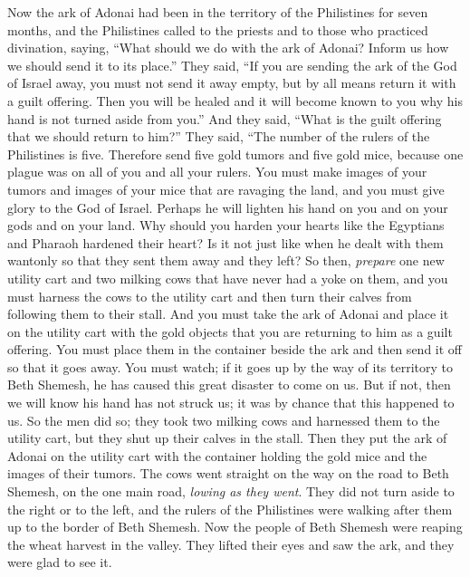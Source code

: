 \begin{biblechapter} %
 Now the ark of Adonai had been in the territory of the Philistines for seven months,
\verse and the Philistines called to the priests and to those who practiced divination, saying, “What should we do with the ark of Adonai? Inform us how we should send it to its place.”
\verse They said, “If you are sending the ark of the God of Israel away, you must not send it away empty, but by all means return it with a guilt offering. Then you will be healed and it will become known to you why his hand is not turned aside from you.”
\verse And they said, “What is the guilt offering that we should return to him?” They said, “The number of the rulers of the Philistines is five. Therefore send five gold tumors and five gold mice, because one plague was on all of you and all your rulers.
\verse You must make images of your tumors and images of your mice that are ravaging the land, and you must give glory to the God of Israel. Perhaps he will lighten his hand on you and on your gods and on your land.
\verse Why should you harden your hearts like the Egyptians and Pharaoh hardened their heart? Is it not just like when he dealt with them wantonly so that they sent them away and they left?
\verse So then, \textit{prepare} one new utility cart and two milking cows that have never had a yoke on them, and you must harness the cows to the utility cart and then turn their calves from following them to their stall.
\verse And you must take the ark of Adonai and place it on the utility cart with the gold objects that you are returning to him as a guilt offering. You must place them in the container beside the ark and then send it off so that it goes away.
\verse You must watch; if it goes up by the way of its territory to Beth Shemesh, he has caused this great disaster to come on us. But if not, then we will know his hand has not struck us; it was by chance that this happened to us.
\verse So the men did so; they took two milking cows and harnessed them to the utility cart, but they shut up their calves in the stall.
\verse Then they put the ark of Adonai on the utility cart with the container holding the gold mice and the images of their tumors.
\verse The cows went straight on the way on the road to Beth Shemesh, on the one main road, \textit{lowing as they went}. They did not turn aside to the right or to the left, and the rulers of the Philistines were walking after them up to the border of Beth Shemesh.
\verse Now the people of Beth Shemesh were reaping the wheat harvest in the valley. They lifted their eyes and saw the ark, and they were glad to see it.

\end{biblechapter}
